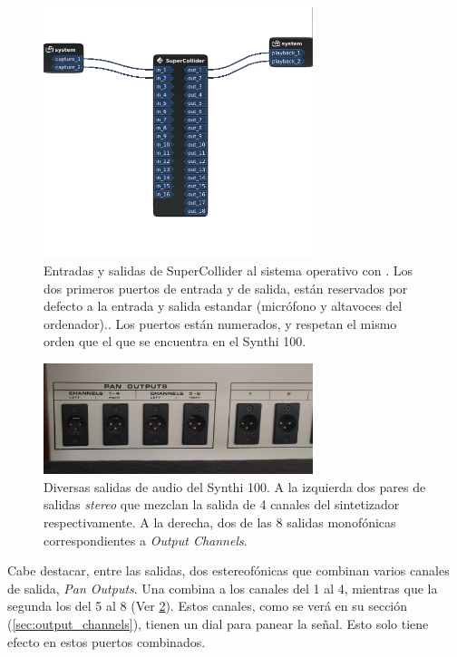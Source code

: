\begin{figure}
	\centering
	\includegraphics[width=0.7\textwidth]{images/entradas_salidas}
	\caption[Entradas y salidas al sistema]{Entradas y salidas de SuperCollider al sistema operativo con \appName. Los dos primeros puertos de entrada y de salida, están reservados por defecto a la entrada y salida estandar (micrófono y altavoces del ordenador).. Los puertos están numerados, y respetan el mismo orden que el que se encuentra en el Synthi 100.}
	\label{fig:entradas_salidas}
\end{figure}

\begin{figure}
	\centering
	\includegraphics[width=0.7\textwidth]{images/outputs_xlr}
	\caption[]{Diversas salidas de audio del Synthi 100. A la izquierda dos pares de salidas \textit{stereo} que mezclan la salida de 4 canales del sintetizador respectivamente. A la derecha, dos de las 8 salidas monofónicas correspondientes a \textit{Output Channels}.}
	\label{fig:outputs_xlr}
\end{figure}

Cabe destacar, entre las salidas, dos estereofónicas que combinan varios canales de salida, \textit{Pan Outputs}. Una combina a los canales del 1 al 4, mientras que la segunda los del 5 al 8 (Ver \ref{fig:outputs_xlr}). Estos canales, como se verá en su sección (\ref*{sec:output_channels}), tienen un dial para panear la señal. Esto solo tiene efecto en estos puertos combinados.